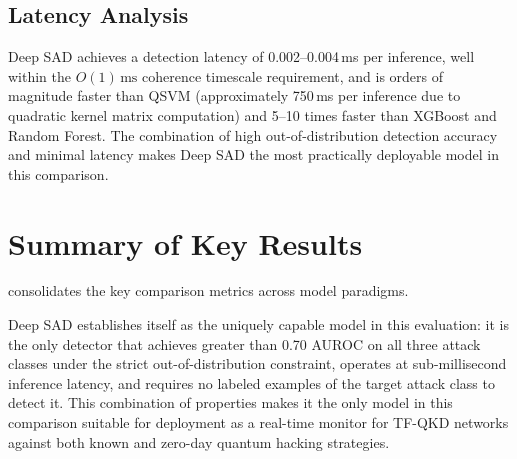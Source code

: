 \documentclass[12pt, a4paper]{report}
\begin{document}
\subsection{Latency Analysis}
Deep SAD achieves a detection latency of 0.002--0.004\,ms per inference, well within the $O(1)\,\text{ms}$ coherence timescale requirement, and is orders of magnitude faster than QSVM (approximately 750\,ms per inference due to quadratic kernel matrix computation) and 5--10 times faster than XGBoost and Random Forest. The combination of high out-of-distribution detection accuracy and minimal latency makes Deep SAD the most practically deployable model in this comparison.

\section{Summary of Key Results}\label{sec:ood_summary}
 consolidates the key comparison metrics across model paradigms.

\begin{table}[h]
\centering
\caption{Consolidated comparison of key metrics across model paradigms. Deep SAD uniquely combines out-of-distribution generalization with sub-millisecond latency.}
\label{tab:summary}
\end{table}

Deep SAD establishes itself as the uniquely capable model in this evaluation: it is the only detector that achieves greater than 0.70 AUROC on all three attack classes under the strict out-of-distribution constraint, operates at sub-millisecond inference latency, and requires no labeled examples of the target attack class to detect it. This combination of properties makes it the only model in this comparison suitable for deployment as a real-time monitor for TF-QKD networks against both known and zero-day quantum hacking strategies.
\end{document}
